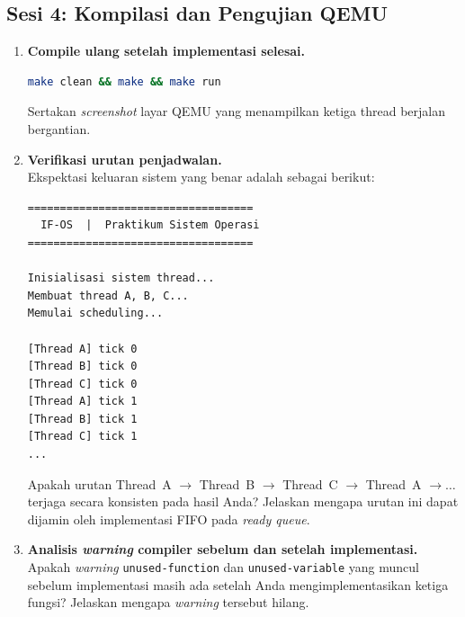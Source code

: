 \subsection{Sesi 4: Kompilasi dan Pengujian QEMU}

\begin{enumerate}

	\item \textbf{Compile ulang setelah implementasi selesai.}

	      \begin{lstlisting}[language=bash, caption={Perintah build dan run setelah implementasi}]
make clean && make && make run
    \end{lstlisting}

	      Sertakan \textit{screenshot} layar QEMU yang menampilkan ketiga
	      thread berjalan bergantian.


	\item \textbf{Verifikasi urutan penjadwalan.}\\
	      Ekspektasi keluaran sistem yang benar adalah sebagai berikut:

	      \begin{lstlisting}[caption={Ekspektasi output Round-Robin di layar QEMU}]
===================================
  IF-OS  |  Praktikum Sistem Operasi
===================================

Inisialisasi sistem thread...
Membuat thread A, B, C...
Memulai scheduling...

[Thread A] tick 0
[Thread B] tick 0
[Thread C] tick 0
[Thread A] tick 1
[Thread B] tick 1
[Thread C] tick 1
...
    \end{lstlisting}

	      Apakah urutan Thread~A $\to$ Thread~B $\to$ Thread~C $\to$
	      Thread~A $\to \ldots$ terjaga secara konsisten pada hasil Anda?
	      Jelaskan mengapa urutan ini dapat dijamin oleh implementasi FIFO
	      pada \textit{ready queue}.

	\item \textbf{Analisis \textit{warning} compiler sebelum dan setelah
		      implementasi.}\\
	      Apakah \textit{warning} \texttt{unused-function} dan
	      \texttt{unused-variable} yang muncul sebelum implementasi masih
	      ada setelah Anda mengimplementasikan ketiga fungsi? Jelaskan
	      mengapa \textit{warning} tersebut hilang.

\end{enumerate}

